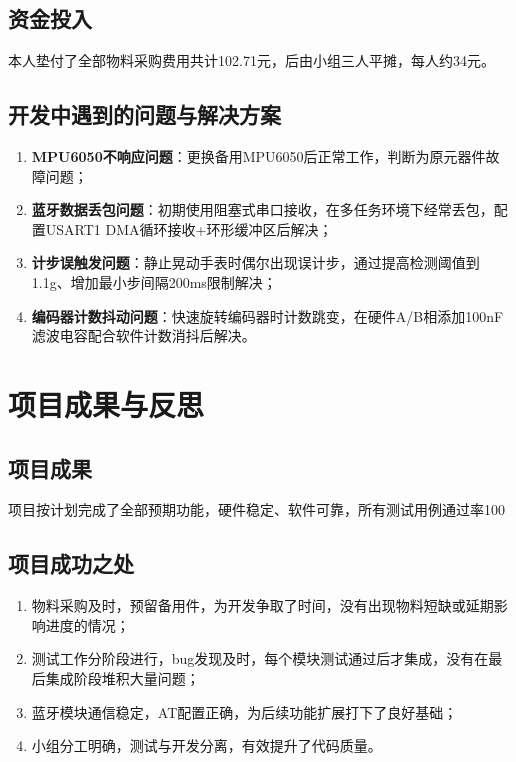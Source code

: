 \documentclass[12pt, a4paper]{ctexart}
\begin{document}
\subsection{资金投入}
本人垫付了全部物料采购费用共计102.71元，后由小组三人平摊，每人约34元。

\subsection{开发中遇到的问题与解决方案}
\begin{enumerate}
    \item \textbf{MPU6050不响应问题}：更换备用MPU6050后正常工作，判断为原元器件故障问题；
    \item \textbf{蓝牙数据丢包问题}：初期使用阻塞式串口接收，在多任务环境下经常丢包，配置USART1 DMA循环接收+环形缓冲区后解决；
    \item \textbf{计步误触发问题}：静止晃动手表时偶尔出现误计步，通过提高检测阈值到1.1g、增加最小步间隔200ms限制解决；
    \item \textbf{编码器计数抖动问题}：快速旋转编码器时计数跳变，在硬件A/B相添加100nF滤波电容配合软件计数消抖后解决。
\end{enumerate}

\section{项目成果与反思}
\subsection{项目成果}
项目按计划完成了全部预期功能，硬件稳定、软件可靠，所有测试用例通过率100%

\subsection{项目成功之处}
\begin{enumerate}
    \item 物料采购及时，预留备用件，为开发争取了时间，没有出现物料短缺或延期影响进度的情况；
    \item 测试工作分阶段进行，bug发现及时，每个模块测试通过后才集成，没有在最后集成阶段堆积大量问题；
    \item 蓝牙模块通信稳定，AT配置正确，为后续功能扩展打下了良好基础；
    \item 小组分工明确，测试与开发分离，有效提升了代码质量。
\end{enumerate}
\end{document}
